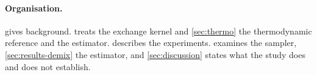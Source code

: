 \paragraph{Organisation.}  gives background.  treats the exchange kernel and \cref{sec:thermo} the thermodynamic reference and the estimator.  describes the experiments.  examines the sampler, \cref{sec:results-demix} the estimator, and \cref{sec:discussion} states what the study does and does not establish.
